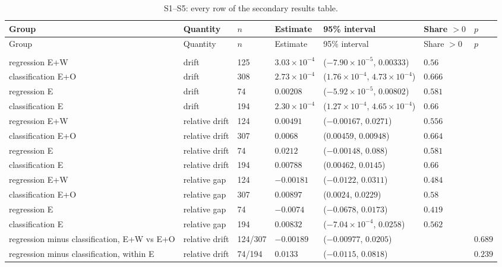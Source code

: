 {\scriptsize\setlength{\tabcolsep}{2.5pt}
\begin{longtable}{>{\raggedright\arraybackslash}p{4.1cm}>{\raggedright\arraybackslash}p{1.9cm}p{1.1cm}p{1.9cm}p{3.5cm}p{0.9cm}p{1.6cm}}
\caption{S1--S5: every row of the secondary results table.}\label{tab:secondary}\\
\toprule
Group & Quantity & $n$ & Estimate & 95\% interval & Share $>0$ & $p$ \\
\midrule
\endfirsthead
\toprule
Group & Quantity & $n$ & Estimate & 95\% interval & Share $>0$ & $p$ \\
\midrule
\endhead
\midrule
\multicolumn{7}{l}{\textbf{S1}} \\
regression E+W & drift & 125 & $3.03\times10^{-4}$ & ($-7.90\times10^{-5}$, $0.00333$) & $0.56$ &  \\
classification E+O & drift & 308 & $2.73\times10^{-4}$ & ($1.76\times10^{-4}$, $4.73\times10^{-4}$) & $0.666$ &  \\
regression E & drift & 74 & $0.00208$ & ($-5.92\times10^{-5}$, $0.00802$) & $0.581$ &  \\
classification E & drift & 194 & $2.30\times10^{-4}$ & ($1.27\times10^{-4}$, $4.65\times10^{-4}$) & $0.66$ &  \\
regression E+W & relative drift & 124 & $0.00491$ & ($-0.00167$, $0.0271$) & $0.556$ &  \\
classification E+O & relative drift & 307 & $0.0068$ & ($0.00459$, $0.00948$) & $0.664$ &  \\
regression E & relative drift & 74 & $0.0212$ & ($-0.00148$, $0.088$) & $0.581$ &  \\
classification E & relative drift & 194 & $0.00788$ & ($0.00462$, $0.0145$) & $0.66$ &  \\
regression E+W & relative gap & 124 & $-0.00181$ & ($-0.0122$, $0.0311$) & $0.484$ &  \\
classification E+O & relative gap & 307 & $0.00897$ & ($0.0024$, $0.0229$) & $0.58$ &  \\
regression E & relative gap & 74 & $-0.0074$ & ($-0.0678$, $0.0173$) & $0.419$ &  \\
classification E & relative gap & 194 & $0.00832$ & ($-7.04\times10^{-4}$, $0.0258$) & $0.562$ &  \\
regression minus classification, E+W vs E+O & relative drift & 124/307 & $-0.00189$ & ($-0.00977$, $0.0205$) &  & $0.689$ \\
regression minus classification, within E & relative drift & 74/194 & $0.0133$ & ($-0.0115$, $0.0818$) &  & $0.239$ \\

\end{longtable}}
